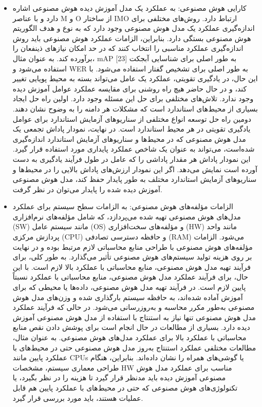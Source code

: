 \documentclass[a4paper,10pt]{article}
\begin{document}
\begin{itemize}
                        \item کارایی هوش مصنوعی: به عملکرد یک مدل آموزش دیده هوش مصنوعی اشاره دارد و با عناصر M و O از ساختار IMO ارتباط دارد. روش‌های مختلفی برای اندازه‌گیری عملکرد یک مدل هوش مصنوعی وجود دارد که به نوع و هدف الگوریتم هوش مصنوعی بستگی دارد. بنابراین، الزامات عملکرد هوش مصنوعی باید روش اندازه‌گیری عملکرد مناسبی را انتخاب کنند که در حد امکان نیازهای ذینفعان را برآورده کند. به عنوان مثال، mAP به طور اصلی برای شناسایی آبجکت [23] استفاده می‌شود و WER به طور اصلی برای تشخیص گفتار استفاده می‌شود. با این حال، در یادگیری تقویتی، عملکرد یک عامل می‌تواند بسته به محیط پویایی تغییر کند، و در حال حاضر هیچ راه روشنی برای مقایسه عملکرد عوامل آموزش دیده وجود ندارد. تلاش‌های مختلفی برای حل این مسئله وجود دارد. اولین راه حل ایجاد بسیاری از محیط‌های استاندارد است که مشکلات هر دامنه را به وضوح نشان دهند. دومین راه حل توسعه انواع مختلفی از سناریوهای آزمایش استاندارد برای عوامل یادگیری تقویتی در هر محیط استاندارد است. در نهایت، نمودار پاداش تجمعی یک مدل هوش مصنوعی که در محیط‌ها و سناریوهای آزمایش استاندارد اندازه‌گیری شده‌است، می‌تواند به عنوان یک شاخص عملکرد پایداری مورد استفاده قرار گیرد. این نمودار پاداش هر مقدار پاداشی را که عامل در طول فرآیند یادگیری به دست آورده است نمایش می‌دهد. اگر این نمودار ارزش‌های پاداش بالایی را در محیط‌ها و سناریوهای آزمایش استاندارد مختلف به طور پایدار حفظ کند، مدل هوش مصنوعی آموزش دیده شده را پایدار می‌توان در نظر گرفت.

                        \item الزامات مؤلفه‌های هوش مصنوعی: به الزامات سطح سیستم برای عملکرد مدل‌های هوش مصنوعی تهیه شده می‌پردازد، که شامل مؤلفه‌های نرم‌افزاری (SW) مانند سیستم عامل (OS) و مؤلفه‌های سخت‌افزاری (HW) مانند واحد پردازش مرکزی (CPU) و حافظه دسترسی تصادفی (RAM) می‌شود. الزامات مؤلفه‌های هوش مصنوعی با طراحی منابع محاسباتی لازم مرتبط بوده و در نهایت بر روی هزینه تولید سیستم‌های هوش مصنوعی تأثیر می‌گذارد. به طور کلی، برای فرآیند تهیه مدل هوش مصنوعی، منابع محاسباتی با عملکرد بالا لازم است. با این حال، برای فرآیند عملکرد مدل هوش مصنوعی، منابع محاسباتی با عملکرد نسبتاً پایین لازم است. در فرآیند تهیه مدل هوش مصنوعی، داده‌ها یا محیطی که برای آموزش آماده شده‌اند، به حافظه سیستم بارگذاری شده و وزن‌های مدل هوش مصنوعی به‌طور مکرر محاسبه و به‌روزرسانی می‌شود. در حالی که فرآیند عملکرد مدل هوش مصنوعی تنها نیاز به استنتاج با استفاده از مدل هوش مصنوعی آموزش دیده دارد. بسیاری از مطالعات در حال انجام است برای پوشش دادن نقص منابع محاسباتی با عملکرد بالا برای عملکرد مدل‌های هوش مصنوعی. به عنوان مثال، مطالعات مختلفی عملکرد استنتاج به‌روز مدل هوش مصنوعی حتی در محیط‌های با عملکرد پایین مانند CPUs یا گوشی‌های همراه را نشان داده‌اند. بنابراین، هنگام طراحی معماری سیستم، مشخصات HW مناسب برای عملکرد مدل هوش مصنوعی آموزش دیده باید مدنظر قرار گیرد تا هزینه را در نظر بگیرد، یا تکنولوژی‌های هوش مصنوعی که حتی در محیط‌های با عملکرد پایین هم قابل عملیات هستند، باید مورد بررسی قرار گیرد.

                    \end{itemize}
        
\end{document}
